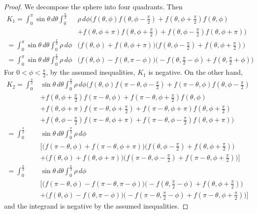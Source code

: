 \documentclass[a4paper]{amsart}
\theoremstyle{plain} %
\theoremstyle{definition} %
\theoremstyle{remark}
\begin{document}
\begin{proof}
	We decompose the sphere into four quadrants.  Then
	\begin{align*}
		K_1 = \int_0^\pi \sin\theta \, d\theta \int_{0}^{\tfrac{\pi}{2}} & \rho \, d\phi
		\big(f(\theta, \phi) f(\theta, \phi-\tfrac{\pi}{2}) + f(\theta, \phi+\tfrac{\pi}{2}) f(\theta, \phi)\\
		&+ f(\theta, \phi+\pi) f(\theta, \phi+\tfrac{\pi}{2}) + f(\theta, \phi-\tfrac{\pi}{2}) f(\theta, \phi+\pi) \big)\\
		= \int_0^\pi \sin\theta \, d\theta \int_{0}^{\tfrac{\pi}{2}} \rho \, d\phi
		& \big( f(\theta, \phi) + f(\theta, \phi + \pi) \big) \big( f(\theta, \phi - \tfrac{\pi}{2}) + f(\theta, \phi + \tfrac{\pi}{2}) \big)\\
		= \int_0^\pi \sin\theta \, d\theta \int_{0}^{\tfrac{\pi}{2}} \rho \, d\phi
		& \big( f(\theta, \phi) - f(\theta, \pi - \phi) \big) \big(-f(\theta, \tfrac{\pi}{2} - \phi) + f(\theta, \tfrac{\pi}{2} + \phi) \big)
	\end{align*}
	For $0 < \phi < \tfrac{\pi}{2}$, by the assumed inequalities, $K_1$ is
	negative.  On the other hand,
	\begin{align*}
		K_2 = \int_0^{\tfrac{\pi}{2}} & \sin\theta \, d\theta \int_{0}^{\tfrac{\pi}{2}} \rho \, d\phi \big(
			f(\theta, \phi) f(\pi - \theta, \phi-\tfrac{\pi}{2}) + f(\pi - \theta, \phi) f(\theta, \phi-\tfrac{\pi}{2})\\
			&+f(\theta, \phi+\tfrac{\pi}{2}) f(\pi - \theta, \phi) + f(\pi - \theta, \phi+\tfrac{\pi}{2}) f(\theta, \phi)\\
			&+f(\theta, \phi+\pi) f(\pi - \theta, \phi+\tfrac{\pi}{2}) + f(\pi - \theta, \phi+\pi) f(\theta, \phi+\tfrac{\pi}{2})\\
			&+f(\theta, \phi-\tfrac{\pi}{2}) f(\pi - \theta, \phi+\pi) + f(\pi - \theta, \phi-\tfrac{\pi}{2}) f(\theta, \phi+\pi)
		\big)\\
		= \int_0^{\tfrac{\pi}{2}} & \sin\theta \, d\theta \int_{0}^{\tfrac{\pi}{2}} \rho \, d\phi \\ & \Big[
			\big(f(\pi - \theta, \phi) + f(\pi - \theta, \phi + \pi) \big) \big( f(\theta, \phi - \tfrac{\pi}{2}) + f(\theta, \phi + \tfrac{\pi}{2}) \big) \\
			&+\big(f(\theta, \phi) + f(\theta, \phi + \pi) \big) \big( f(\pi - \theta, \phi - \tfrac{\pi}{2}) + f(\pi - \theta, \phi + \tfrac{\pi}{2}) \big) 
		\Big] \\
		= \int_0^{\tfrac{\pi}{2}} & \sin\theta \, d\theta \int_{0}^{\tfrac{\pi}{2}}\rho \, d\phi \\ & \Big[
			\big(f(\pi - \theta, \phi) - f(\pi - \theta, \pi - \phi) \big) \big( -f(\theta, \tfrac{\pi}{2} - \phi) + f(\theta, \phi + \tfrac{\pi}{2}) \big) \\
			&+\big(f(\theta, \phi) - f(\theta, \pi - \phi) \big) \big( -f(\pi - \theta, \tfrac{\pi}{2} - \phi) + f(\pi - \theta, \phi + \tfrac{\pi}{2}) \big) 
		\Big]
	\end{align*}
	and the integrand is negative by the assumed inequalities.
\end{proof}
\end{document}
